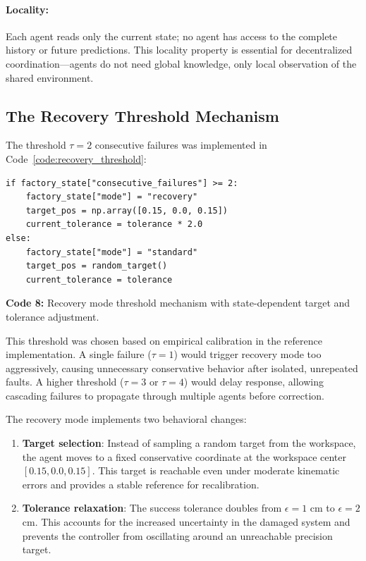 \documentclass[12pt,a4paper,oneside]{report}
\begin{document}
\paragraph{Locality:} Each agent reads only the current state; no agent has access to the complete history or future predictions. This locality property is essential for decentralized coordination—agents do not need global knowledge, only local observation of the shared environment.

\subsection{The Recovery Threshold Mechanism}
\label{subsec:the_recovery_threshold_mechanism}

The threshold $\tau = 2$ consecutive failures was implemented in Code~\ref{code:recovery_threshold}:

\begin{verbatim}
if factory_state["consecutive_failures"] >= 2:
    factory_state["mode"] = "recovery"
    target_pos = np.array([0.15, 0.0, 0.15])
    current_tolerance = tolerance * 2.0
else:
    factory_state["mode"] = "standard"
    target_pos = random_target()
    current_tolerance = tolerance
\end{verbatim}
\vspace{0.2cm}
{\small \textbf{Code 8:} Recovery mode threshold mechanism with state-dependent target and tolerance adjustment.\label{code:recovery_threshold}}
\vspace{0.3cm}

This threshold was chosen based on empirical calibration in the reference implementation. A single failure ($\tau = 1$) would trigger recovery mode too aggressively, causing unnecessary conservative behavior after isolated, unrepeated faults. A higher threshold ($\tau = 3$ or $\tau = 4$) would delay response, allowing cascading failures to propagate through multiple agents before correction.

The recovery mode implements two behavioral changes:

\begin{enumerate}
    \item \textbf{Target selection}: Instead of sampling a random target from the workspace, the agent moves to a fixed conservative coordinate at the workspace center $[0.15, 0.0, 0.15]$. This target is reachable even under moderate kinematic errors and provides a stable reference for recalibration.
    \item \textbf{Tolerance relaxation}: The success tolerance doubles from $\epsilon = 1$ cm to $\epsilon = 2$ cm. This accounts for the increased uncertainty in the damaged system and prevents the controller from oscillating around an unreachable precision target.
\end{enumerate}
\end{document}
